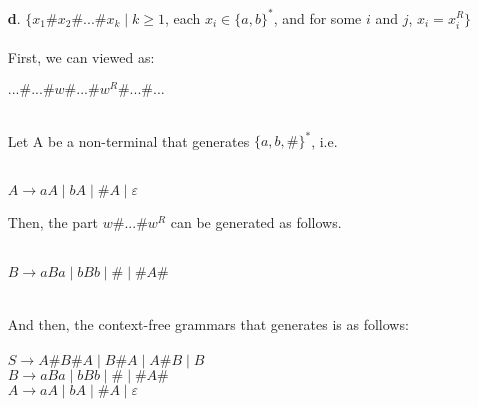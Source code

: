 \documentclass[12pt]{letter}
\begin{document}
\begin{enumerate}
\begin{enumerate}
	\item[\textbf{d}.] $\{ x_1\#x_2\#...\#x_k \mid k \geq1$, each $x_i \in \{a,b\}^*$, and for some $i$ and $j$, $x_i = x_i^R\}$ \\
	\leavevmode \\
	First, we can viewed as: \\
	\begin{center} $...\#...\#w\#...\#w^R\#...\#...$\end{center}
	\leavevmode \\
	Let A be a non-terminal that generates $\{a, b, \#\}^*$, i.e.\\
	\leavevmode \\
	\begin{center} $A \rightarrow aA \mid bA \mid \#A \mid \varepsilon$\end{center}
	Then, the part $w\#...\#w^R$ can be generated as follows.\\
	\leavevmode \\
	\begin{center} $B \rightarrow aBa \mid bBb \mid \# \mid \#A\#$\end{center}
	\leavevmode \\
	And then, the context-free grammars that generates is as follows: \\
	\leavevmode \\
	\setlength\parindent{100pt} 
	$S \rightarrow A\#B\#A \mid B\#A \mid A\#B \mid B$\\
	$B \rightarrow aBa \mid bBb \mid \# \mid \#A\#$ \\
	$A \rightarrow aA \mid bA \mid \#A \mid \varepsilon$
	\setlength\parindent{0pt} 
\end{enumerate}


\end{enumerate}
\end{document}
